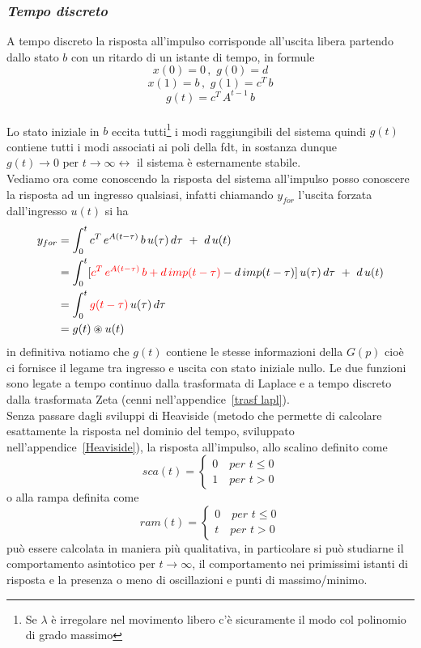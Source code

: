 \documentclass[a4paper]{article}
\begin{document}
	\subsubsection*{\textit{Tempo discreto}}
	A tempo discreto la risposta all'impulso corrisponde all'uscita libera partendo dallo stato $b$ con un ritardo di un istante di tempo, in formule \[x(0)=0\,,\,\,g(0)=d\]
	\[x(1)=b\,,\,\,g(1)=c^T\,b\]\[ g(t)=c^T\,A^{t-1}\,b\]
	\newline \\
	Lo stato iniziale in $b$ eccita tutti\footnote{Se $\lambda$ è irregolare nel movimento libero c'è sicuramente il modo col polinomio di grado massimo} i modi raggiungibili del sistema quindi $g(t)$ contiene tutti i modi associati ai poli della fdt, in sostanza dunque $g(t)\to 0 \text{ per } t\to\infty \leftrightarrow$ il sistema è esternamente stabile.
	\newline \\
	Vediamo ora come conoscendo la risposta del sistema all'impulso posso conoscere la risposta ad un ingresso qualsiasi, infatti chiamando $y_{for}$ l'uscita forzata dall'ingresso $u(t)$ si ha
	\begin{align*}
	y_{for}&=	\int_{0}^{t}c^T\,e^{A(t-\tau)}\,b\,u(\tau)\,d\tau\,\,+\,\,d\,u(t)\\&=\int_{0}^{t}[\color{red}c^T\,e^{A(t-\tau)}\,b+d\,imp(t-\tau)\color{black}-d\,imp(t-\tau)]\,u(\tau)\,d\tau\,\,+\,\,d\,u(t) \\&=\int_{0}^{t}\color{red}g(t-\tau)\color{black}\,u(\tau)\,d\tau\\& = g(t) \circledast u(t)
	\end{align*}
	in definitiva notiamo che $g(t)$ contiene le stesse informazioni della $G(p)$ cioè ci fornisce il legame tra ingresso e uscita con stato iniziale nullo. Le due funzioni sono legate a tempo continuo dalla trasformata di Laplace e a tempo discreto dalla trasformata Zeta (cenni nell'appendice~\ref{trasf lapl}).
	\\Senza passare dagli sviluppi di Heaviside (metodo che permette di calcolare esattamente la risposta nel dominio del tempo, sviluppato nell'appendice~\ref{Heaviside}), la risposta all'impulso, allo scalino definito come 
	\[sca(t)=\begin{cases}
	0 \quad per \,\, t\le0 \\
	1 \quad per \,\, t>0
	\end{cases}\]
	o alla rampa definita come 
	\[ram(t)=\begin{cases}
	0 \quad per \,\, t\le0 \\
	t \quad per \,\, t>0
	\end{cases}\]
	può essere calcolata in maniera più qualitativa, in particolare si può studiarne il comportamento asintotico per $t\to\infty$, il comportamento nei primissimi istanti di risposta e la presenza o meno di oscillazioni e punti di massimo/minimo. 
	
\end{document}
